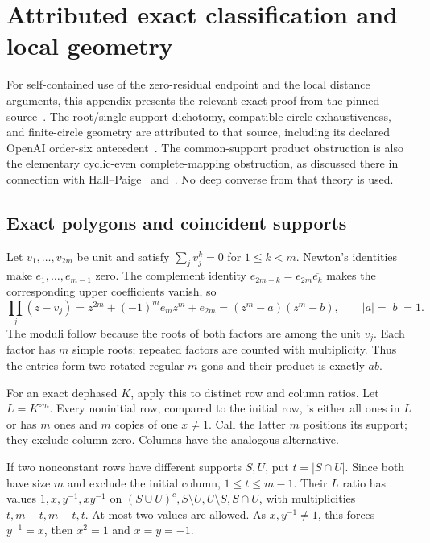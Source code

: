 \section{Attributed exact classification and local geometry}\label{app:exact}
For self-contained use of the zero-residual endpoint and the local distance arguments, this appendix presents the relevant exact proof from the pinned source~\cite{mio}. The root/single-support dichotomy, compatible-circle exhaustiveness, and finite-circle geometry are attributed to that source, including its declared OpenAI order-six antecedent~\cite{openai}. The common-support product obstruction is also the elementary cyclic-even complete-mapping obstruction, as discussed there in connection with Hall--Paige~\cite{HP} and~\cite{EMM}. No deep converse from that theory is used.

\subsection{Exact polygons and coincident supports}
Let $v_1,\ldots,v_{2m}$ be unit and satisfy $\sum_jv_j^k=0$ for $1\le k<m$. Newton's identities make $e_1,\ldots,e_{m-1}$ zero. The complement identity $e_{2m-k}=e_{2m}\overline{e_k}$ makes the corresponding upper coefficients vanish, so
\begin{equation}\label{eq:exactpolygons}
 \prod_j(z-v_j)=z^{2m}+(-1)^me_mz^m+e_{2m}
 =(z^m-a)(z^m-b),\qquad |a|=|b|=1.
\end{equation}
The moduli follow because the roots of both factors are among the unit $v_j$. Each factor has $m$ simple roots; repeated factors are counted with multiplicity. Thus the entries form two rotated regular $m$-gons and their product is exactly $ab$.

For an exact dephased $K$, apply this to distinct row and column ratios. Let $L=K^{\circ m}$. Every noninitial row, compared to the initial row, is either all ones in $L$ or has $m$ ones and $m$ copies of one $x\ne1$. Call the latter $m$ positions its support; they exclude column zero. Columns have the analogous alternative.

If two nonconstant rows have different supports $S,U$, put $t=|S\cap U|$. Since both have size $m$ and exclude the initial column, $1\le t\le m-1$. Their $L$ ratio has values $1,x,y^{-1},xy^{-1}$ on $\left(S\cup U\right)^c,S\setminus U,U\setminus S,S\cap U$, with multiplicities $t,m-t,m-t,t$. At most two values are allowed. As $x,y^{-1}\ne1$, this forces $y^{-1}=x$, then $x^2=1$ and $x=y=-1$.

